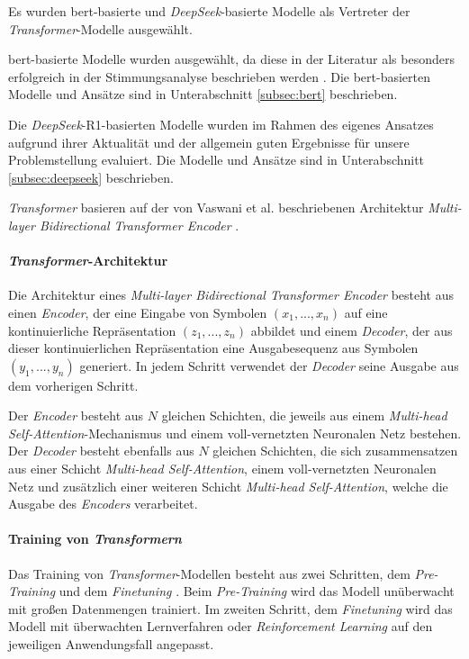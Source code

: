 Es wurden \gls{bert}-basierte und \textit{DeepSeek}-basierte Modelle als Vertreter der \textit{Transformer}-Modelle ausgewählt.

\gls{bert}-basierte Modelle wurden ausgewählt, da diese in der Literatur als besonders erfolgreich in der Stimmungsanalyse beschrieben werden \cite{devlin2018bert}.
Die \gls{bert}-basierten Modelle und Ansätze sind in Unterabschnitt \ref{subsec:bert} beschrieben.

Die \textit{DeepSeek}-R1-basierten Modelle wurden im Rahmen des eigenes Ansatzes aufgrund ihrer Aktualität und der allgemein guten Ergebnisse für unsere Problemstellung evaluiert.
Die Modelle und Ansätze sind in Unterabschnitt \ref{subsec:deepseek} beschrieben.

\textit{Transformer} basieren auf der von Vaswani et al. beschriebenen Architektur \textit{Multi-layer Bidirectional Transformer Encoder} \cite{vaswani2017attention}.

\paragraph{\textit{Transformer}-Architektur}
Die Architektur eines \textit{Multi-layer Bidirectional Transformer Encoder} besteht aus einen \textit{Encoder}, der eine Eingabe von Symbolen $(x_1,...,x_n)$ auf eine kontinuierliche Repräsentation $(z_1,...,z_n)$ abbildet und einem \textit{Decoder}, der aus dieser kontinuierlichen Repräsentation eine Ausgabesequenz aus Symbolen $(y_1,...,y_n)$ generiert.
In jedem Schritt verwendet der \textit{Decoder} seine Ausgabe aus dem vorherigen Schritt.

Der \textit{Encoder} besteht aus $N$ gleichen Schichten, die jeweils aus einem \textit{Multi-head Self-Attention}-Mechanismus und einem voll-vernetzten Neuronalen Netz bestehen.
Der \textit{Decoder} besteht ebenfalls aus $N$ gleichen Schichten, die sich zusammensatzen aus einer Schicht \textit{Multi-head Self-Attention}, einem voll-vernetzten Neuronalen Netz und zusätzlich einer weiteren Schicht \textit{Multi-head Self-Attention}, welche die Ausgabe des \textit{Encoders} verarbeitet.

\paragraph{Training von \textit{Transformern}}

Das Training von \textit{Transformer}-Modellen besteht aus zwei Schritten, dem \textit{Pre-Training} und dem \textit{Finetuning} \cite{Radford2018ImprovingLU}.
Beim \textit{Pre-Training} wird das Modell unüberwacht mit großen Datenmengen trainiert.
Im zweiten Schritt, dem \textit{Finetuning} wird das Modell mit überwachten Lernverfahren oder \textit{Reinforcement Learning} \cite{deepseekai2025deepseekr1incentivizingreasoningcapability, devlin2018bert} auf den jeweiligen Anwendungsfall angepasst.


